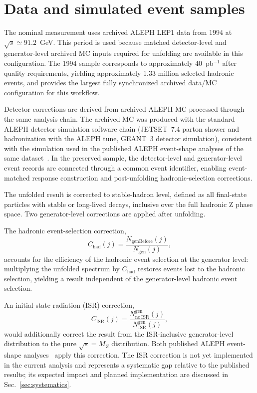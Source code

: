 \section{Data and simulated event samples}
\label{sec:datasets}

The nominal measurement uses archived ALEPH LEP1 data from 1994 at $\sqrt{s}\simeq 91.2$~GeV. This period is used because matched detector-level and generator-level archived MC inputs required for unfolding are available in this configuration. The 1994 sample corresponds to approximately 40~pb$^{-1}$ after quality requirements, yielding approximately 1.33 million selected hadronic events, and provides the largest fully synchronized archived data/MC configuration for this workflow.

Detector corrections are derived from archived ALEPH MC processed through the same analysis chain. The archived MC was produced with the standard ALEPH detector simulation software chain (JETSET~7.4 parton shower and hadronization with the ALEPH tune, GEANT~3 detector simulation), consistent with the simulation used in the published ALEPH event-shape analyses of the same dataset~\cite{Heister:2003aj}. In the preserved sample, the detector-level and generator-level event records are connected through a common event identifier, enabling event-matched response construction and post-unfolding hadronic-selection corrections.

The unfolded result is corrected to stable-hadron level, defined as all final-state particles with stable or long-lived decays, inclusive over the full hadronic Z phase space. Two generator-level corrections are applied after unfolding.

The hadronic event-selection correction,
\begin{equation}
C_{\mathrm{had}}(j) = \frac{N_{\mathrm{genBefore}}(j)}{N_{\mathrm{gen}}(j)},
\end{equation}
accounts for the efficiency of the hadronic event selection at the generator level: multiplying the unfolded spectrum by $C_{\mathrm{had}}$ restores events lost to the hadronic selection, yielding a result independent of the generator-level hadronic event selection.

An initial-state radiation (ISR) correction,
\begin{equation}
C_{\mathrm{ISR}}(j) = \frac{N^{\mathrm{gen}}_{\mathrm{no\,ISR}}(j)}{N^{\mathrm{gen}}_{\mathrm{ISR}}(j)},
\end{equation}
would additionally correct the result from the ISR-inclusive generator-level distribution to the pure $\sqrt{s}=M_Z$ distribution. Both published ALEPH event-shape analyses~\cite{Barate:1996fi,Heister:2003aj} apply this correction. The ISR correction is not yet implemented in the current analysis and represents a systematic gap relative to the published results; its expected impact and planned implementation are discussed in Sec.~\ref{sec:systematics}.

